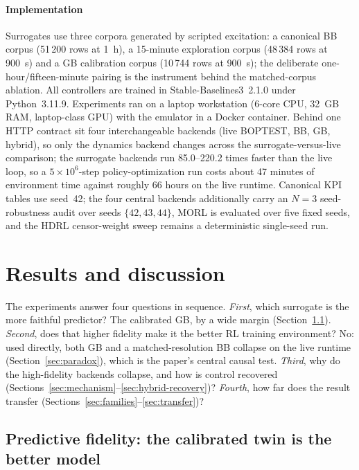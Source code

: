 \documentclass[energies,article,submit,moreauthors]{Definitions/mdpi}
\begin{document}
\paragraph{Implementation}
Surrogates use three corpora generated by scripted excitation: a canonical BB corpus (51\,200 rows
at \SI{1}{\hour}), a 15-minute exploration corpus (48\,384 rows at \SI{900}{\second}) and a GB
calibration corpus (10\,744 rows at \SI{900}{\second}); the deliberate one-hour/fifteen-minute
pairing is the instrument behind the matched-corpus ablation. All controllers are trained in
Stable-Baselines3~2.1.0 under Python~3.11.9. Experiments ran on a laptop workstation (6-core CPU,
32~GB RAM, laptop-class GPU) with the emulator in a Docker container. Behind one HTTP contract sit
four interchangeable backends (live BOPTEST, BB, GB, hybrid), so only the dynamics backend changes
across the surrogate-versus-live comparison; the surrogate backends run \numrange{85.0}{220.2} times
faster than the live loop, so a $5\times10^6$-step policy-optimization run costs about 47 minutes of
environment time against roughly 66 hours on the live runtime. Canonical KPI tables use seed~42; the
four central backends additionally carry an $N=3$ seed-robustness audit over seeds
$\{42,43,44\}$, MORL is evaluated over five fixed seeds, and the HDRL censor-weight sweep remains a
deterministic single-seed run.

\section{Results and discussion}\label{sec:results}

The experiments answer four questions in sequence. \emph{First}, which surrogate is the more
faithful predictor? The calibrated GB, by a wide margin (Section~\ref{sec:fidelity}). \emph{Second},
does that higher fidelity make it the better RL training environment? No: used directly, both GB and
a matched-resolution BB collapse on the live runtime (Section~\ref{sec:paradox}), which is the
paper's central causal test. \emph{Third}, why do the high-fidelity backends collapse, and how is
control recovered (Sections~\ref{sec:mechanism}--\ref{sec:hybrid-recovery})? \emph{Fourth}, how far
does the result transfer (Sections~\ref{sec:families}--\ref{sec:transfer})?

\subsection{Predictive fidelity: the calibrated twin is the better model}\label{sec:fidelity}
\end{document}

